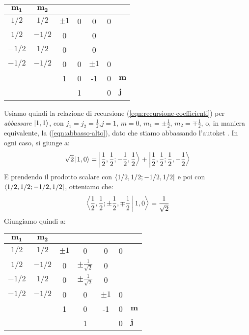 \documentclass[../../FisicaTeorica.tex]{subfiles}
\begin{document}
\begin{table}[H]
\centering
\begin{tabular}{@{}cccccc|l@{}}
\toprule
$\bm{m_1}$ & \multicolumn{1}{c|}{$\bm{m_2}$} &  &  &  &  &  \\ \midrule
$1/2$ & \multicolumn{1}{c|}{$1/2$} & $\pm 1$ & 0 & 0 & 0 &  \\
$1/2$ & \multicolumn{1}{c|}{$-1/2$} & 0  &  & 0 &  &  \\
$-1/2$ & \multicolumn{1}{c|}{$1/2$} & 0 &  & 0 &  &  \\
$-1/2$ & \multicolumn{1}{c|}{$-1/2$} & 0 & 0 & $\pm1$ & 0 &  \\ \midrule
 &  & 1 & 0 & -1 & 0 & $\bm{m}$ \\
 &  & \multicolumn{3}{c}{1} & 0 & $\bm{j}$ \\ \bottomrule
\end{tabular}
\label{tab:clebsh-Gordan-22}
\end{table}
Usiamo quindi la relazione di recursione (\ref{eqn:recursione-coefficienti}) per \textit{abbassare} $\Ket{1,1}$, con $j_1=j_2=\frac{1}{2}$,$j=1$, $m=0$, $m_1=\pm \frac{1}{2}$, $m_2=\mp\frac{1}{2}$, o, in maniera equivalente, la (\ref{eqn:abbasso-alto}), dato che stiamo abbassando l'autoket . In ogni caso, si giunge a:
\begin{align*}
\sqrt{2}\Ket{1,0} =\Ket{\frac{1}{2},\frac{1}{2};-\frac{1}{2},\frac{1}{2}} + \Ket{\frac{1}{2},\frac{1}{2};\frac{1}{2},-\frac{1}{2}}
\end{align*}
E prendendo il prodotto scalare con $\Bra{1/2, 1/2; -1/2, 1/2}$ e poi con $\Bra{1/2, 1/2; -1/2, 1/2}$, otteniamo che:
\begin{align*}
\Braket{\frac{1}{2},\frac{1}{2};\pm \frac{1}{2}, \mp\frac{1}{2}|1,0} = \frac{1}{\sqrt{2}}
\end{align*}
Giungiamo quindi a:
\begin{table}[H]
\centering
\begin{tabular}{@{}cccccc|l@{}}
\toprule
$\bm{m_1}$ & \multicolumn{1}{c|}{$\bm{m_2}$} &  &  &  &  &  \\ \midrule
$1/2$ & \multicolumn{1}{c|}{$1/2$} & $\pm 1$ & 0 & 0 & 0 &  \\
$1/2$ & \multicolumn{1}{c|}{$-1/2$} & 0  & $\pm\frac{1}{\sqrt{2}}$ & 0 &  &  \\
$-1/2$ & \multicolumn{1}{c|}{$1/2$} & 0 & $\pm\frac{1}{\sqrt{2}}$ & 0 &  &  \\
$-1/2$ & \multicolumn{1}{c|}{$-1/2$} & 0 & 0 & $\pm1$ & 0 &  \\ \midrule
 &  & 1 & 0 & -1 & 0 & $\bm{m}$ \\
 &  & \multicolumn{3}{c}{1} & 0 & $\bm{j}$ \\ \bottomrule
\end{tabular}
\label{tab:clebsh-Gordan-3}
\end{table}
\end{document}

